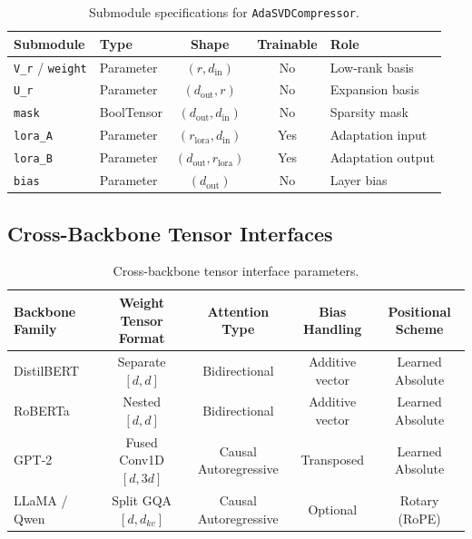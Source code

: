 \documentclass{article}
\begin{document}
\begin{table}[H]
\centering
\small
\begin{tabular}{llccp{5cm}}
\toprule
\textbf{Submodule} & \textbf{Type} & \textbf{Shape} & \textbf{Trainable} & \textbf{Role} \\
\midrule
\texttt{V\_r} / \texttt{weight} & Parameter & $(r, d_{\text{in}})$ & No & Low-rank basis \\
\texttt{U\_r} & Parameter & $(d_{\text{out}}, r)$ & No & Expansion basis \\
\texttt{mask} & BoolTensor & $(d_{\text{out}}, d_{\text{in}})$ & No & Sparsity mask \\
\texttt{lora\_A} & Parameter & $(r_{\text{lora}}, d_{\text{in}})$ & Yes & Adaptation input \\
\texttt{lora\_B} & Parameter & $(d_{\text{out}}, r_{\text{lora}})$ & Yes & Adaptation output \\
\texttt{bias} & Parameter & $(d_{\text{out}})$ & No & Layer bias \\
\bottomrule
\end{tabular}
\caption{Submodule specifications for \texttt{AdaSVDCompressor}.}
\label{tab:submodules_adasvdcompressor}
\end{table}

\subsection{Cross-Backbone Tensor Interfaces}
\begin{table}[H]
\centering
\small
\begin{tabular}{lcccc}
\toprule
\textbf{Backbone Family} & \textbf{Weight Tensor Format} & \textbf{Attention Type} & \textbf{Bias Handling} & \textbf{Positional Scheme} \\
\midrule
DistilBERT & Separate $[d, d]$ & Bidirectional & Additive vector & Learned Absolute \\
RoBERTa & Nested $[d, d]$ & Bidirectional & Additive vector & Learned Absolute \\
GPT-2 & Fused Conv1D $[d, 3d]$ & Causal Autoregressive & Transposed & Learned Absolute \\
LLaMA / Qwen & Split GQA $[d, d_{kv}]$ & Causal Autoregressive & Optional & Rotary (RoPE) \\
\bottomrule
\end{tabular}
\caption{Cross-backbone tensor interface parameters.}
\label{tab:backbone_interfaces}
\end{table}
\end{document}
